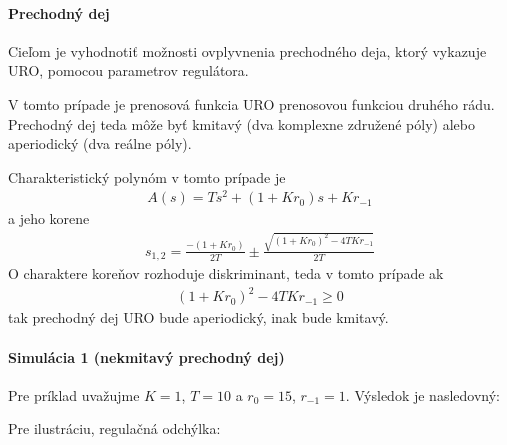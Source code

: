 \documentclass[a4paper, 10pt, ]{article}
\begin{document}
\paragraph{Prechodný dej}
Cieľom je vyhodnotiť možnosti ovplyvnenia prechodného deja, ktorý vykazuje URO, pomocou parametrov regulátora.

V tomto prípade je prenosová funkcia URO prenosovou funkciou druhého rádu. Prechodný dej teda môže byť kmitavý (dva komplexne združené póly) alebo aperiodický (dva reálne póly).

Charakteristický polynóm v tomto prípade je
\begin{align}
    A(s)  =  Ts^2+  (1 + K r_0) s + Kr_{-1}
\end{align}
a jeho korene
\begin{align}
    s_{1,2} = \frac{-(1+K r_0)}{2T} \pm \frac{ \sqrt{(1+K r_0)^2 - 4TKr_{-1} }}{2T}
\end{align}
O charaktere koreňov rozhoduje diskriminant, teda v tomto prípade ak
\begin{align}
     (1+K r_0)^2 - 4TKr_{-1} \geq 0
\end{align}
tak prechodný dej URO bude aperiodický, inak bude kmitavý.




\paragraph{Simulácia 1 (nekmitavý prechodný dej)}

Pre príklad uvažujme $K = 1$, $T = 10$ a $r_0 = 15$, $r_{-1} = 1$. Výsledok je nasledovný:

\begin{center}



    \figcaption{}

\end{center}

\noindent
Pre ilustráciu, regulačná odchýlka:


\begin{center}



    \figcaption{}

\end{center}
\end{document}
